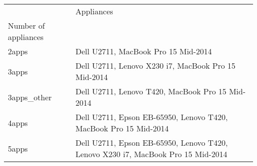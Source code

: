 \begin{tabular}{ll}
\toprule
{} &                                                                        Appliances \\
Number of appliances &                                                                                   \\
\midrule
2apps                &                                               Dell U2711, MacBook Pro 15 Mid-2014 \\
3apps                &                               Dell U2711, Lenovo X230 i7, MacBook Pro 15 Mid-2014 \\
3apps\_other          &                                  Dell U2711, Lenovo T420, MacBook Pro 15 Mid-2014 \\
4apps                &                  Dell U2711, Epson EB-65950, Lenovo T420, MacBook Pro 15 Mid-2014 \\
5apps                &  Dell U2711, Epson EB-65950, Lenovo T420, Lenovo X230 i7, MacBook Pro 15 Mid-2014 \\
\bottomrule
\end{tabular}
